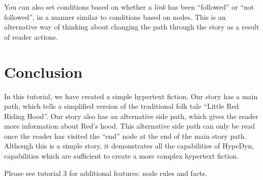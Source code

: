 \documentclass{article}
\begin{document}
You can also set conditions based on whether a \textit{link}
has been ``followed'' or ``not followed'', in a manner similar to conditions
based on nodes. This is an alternative way of thinking about changing the path
through the story as a result of reader actions.

\section{Conclusion}

In this tutorial, we have created a simple hypertext fiction. Our story has a
main path, which tells a simplified version of the traditional folk tale
``Little Red Riding Hood''. Our story also has an alternative side path, which
gives the reader more information about Red's hood. This alternative side path
can only be read once the reader has visited the ``end'' node at the end of the
main story path. Although this is a simple story, it demonstrates all the
capabilities of HypeDyn, capabilities which are sufficient to create a more
complex hypertext fiction.

% 

Please see tutorial 3 for additional features: node rules and facts.
\end{document}
